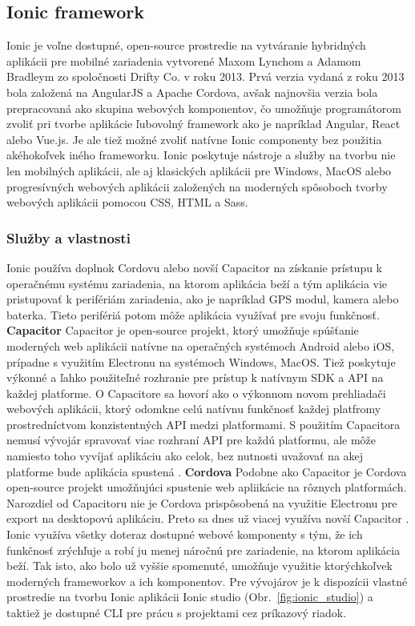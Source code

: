 \subsection{Ionic framework}
\indent Ionic je voľne dostupné, open-source prostredie na vytváranie hybridných aplikácii pre mobilné zariadenia vytvorené Maxom Lynchom a Adamom Bradleym zo spoločnosti Drifty Co. v roku 2013. Prvá verzia vydaná z roku 2013 bola založená na AngularJS a Apache Cordova, avšak najnovšia verzia bola prepracovaná ako skupina webových komponentov, čo umožňuje programátorom zvoliť pri tvorbe aplikácie ľubovolný framework ako je napríklad Angular, React alebo Vue.js. Je ale tiež možné zvoliť natívne Ionic componenty bez použitia akéhokoľvek iného frameworku. Ionic poskytuje nástroje a služby na tvorbu nie len mobilných aplikácii, ale aj klasických aplikácii pre Windows, MacOS alebo progresívných webových aplikácii založených na moderných spôsoboch tvorby webových aplikácii pomocou CSS, HTML a Sass.

\subsubsection{Služby a vlastnosti}
\indent Ionic používa doplnok Cordovu alebo novší Capacitor na získanie prístupu k operačnému systému zariadenia, na ktorom aplikácia beží a tým aplikácia vie pristupovať k perifériám zariadenia, ako je napríklad GPS modul, kamera alebo baterka. Tieto perifériá potom môže aplikácia využívať pre svoju funkčnosť. \newline
\textbf{Capacitor}\newline
\indent Capacitor je open-source projekt, ktorý umožňuje spúšťanie moderných web aplikácii natívne na operačných systémoch Android alebo iOS, prípadne s využitím Electronu na systémoch Windows, MacOS. Tiež poskytuje výkonné a ľahko použiteľné rozhranie pre prístup k natívnym SDK a API na každej platforme. O Capacitore sa hovorí ako o výkonnom novom prehliadači webových aplikácii, ktorý odomkne celú natívnu funkčnosť každej platfromy prostredníctvom konzistentných API medzi platformami. S použitím Capacitora nemusí vývojár spravovať viac rozhraní API pre každú platformu, ale môže namiesto toho vyvíjať aplikáciu ako celok, bez nutnosti uvažovať na akej platforme bude aplikácia spustená \cite{ionic}. \newline
\textbf{Cordova}\newline
\indent Podobne ako Capacitor je Cordova open-source projekt umožňujúci spustenie web apliikácie na rôznych platformách. Narozdiel od Capacitoru nie je Cordova prispôsobená na využitie Electronu pre export na desktopovú aplikáciu. Preto sa dnes už viacej využíva novší Capacitor \cite{ionic}.
\indent Ionic využíva všetky doteraz dostupné webové komponenty s tým, že ich funkčnosť zrýchľuje a robí ju menej náročnú pre zariadenie, na ktorom aplikácia beží. Tak isto, ako bolo už vyššie spomenuté, umožňuje využitie ktorýchkoľvek moderných frameworkov a ich komponentov. Pre vývojárov je k dispozícii vlastné prostredie na tvorbu Ionic aplikácii Ionic studio (Obr.~\ref{fig:ionic_studio}) a taktiež je dostupné CLI pre prácu s projektami cez príkazový riadok. 

